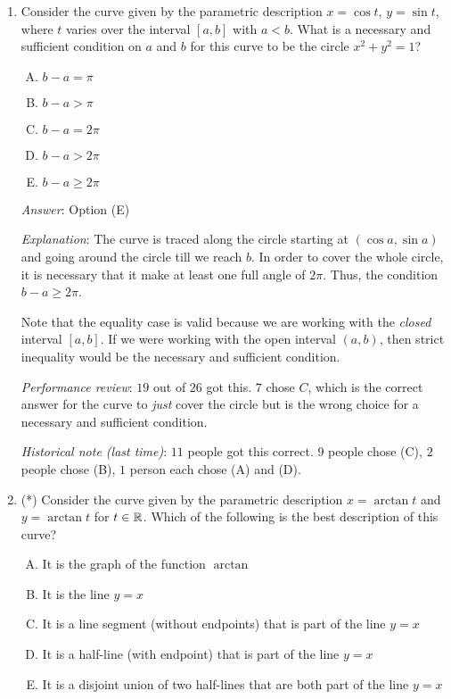 \documentclass[10pt]{amsart}
\begin{document}
\begin{enumerate}
\item Consider the curve given by the parametric description $x = \cos
  t$, $y = \sin t$, where $t$ varies over the interval $[a,b]$ with $a <
  b$. What is a necessary and sufficient condition on $a$ and $b$ for
  this curve to be the circle $x^2 + y^2 = 1$?

  \begin{enumerate}[(A)]
  \item $b - a =\pi$
  \item $b - a > \pi$
  \item $b - a = 2\pi$
  \item $b - a > 2\pi$
  \item $b - a \ge 2\pi$
  \end{enumerate}

  {\em Answer}: Option (E)

  {\em Explanation}: The curve is traced along the circle starting at
  $(\cos a, \sin a)$ and going around the circle till we reach $b$. In
  order to cover the whole circle, it is necessary that it make at
  least one full angle of $2\pi$. Thus, the condition $b - a \ge 2\pi$.

  Note that the equality case is valid because we are working with the
  {\em closed} interval $[a,b]$. If we were working with the open
  interval $(a,b)$, then strict inequality would be the necessary and
  sufficient condition.

  {\em Performance review}: $19$ out of $26$ got this. $7$ chose $C$,
  which is the correct answer for the curve to {\em just} cover the
  circle but is the wrong choice for a necessary and sufficient
  condition.

  {\em Historical note (last time)}: $11$ people got this correct. $9$ people
  chose (C), $2$ people chose (B), $1$ person each chose
  (A) and (D).

\item (*) Consider the curve given by the parametric description $x =
  \arctan t$ and $y = \arctan t$ for $t \in \mathbb{R}$. Which of the
  following is the best description of this curve?

  \begin{enumerate}[(A)]
  \item It is the graph of the function $\arctan$
  \item It is the line $y = x$
  \item It is a line segment (without endpoints) that is part of the
    line $y = x$
  \item It is a half-line (with endpoint) that is part of the line $y
    = x$
  \item It is a disjoint union of two half-lines that are both part of
    the line $y = x$
  \end{enumerate}


\end{enumerate}
\end{document}
